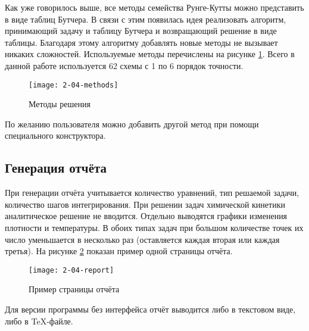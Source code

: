 Как уже говорилось выше, все методы семейства Рунге-Кутты можно представить в виде таблиц Бутчера. В связи с этим появилась идея
реализовать алгоритм, принимающий задачу и таблицу Бутчера и возвращающий решение в виде таблицы. Благодаря этому алгоритму добавлять
новые методы не вызывает никаких сложностей. Используемые методы перечислены на рисунке \ref{fig:SolveMethods}.
Всего в данной работе используется 62 схемы с 1 по 6 порядок точности.

\begin{figure}
    \texttt{[image: 2-04-methods]}
    \caption{Методы решения}
    \label{fig:SolveMethods}
\end{figure}

По желанию пользователя можно добавить другой метод при помощи специального конструктора.

\subsection{Генерация отчёта}

При генерации отчёта учитывается количество уравнений, тип решаемой задачи, количество шагов интегрирования. При решении задач химической
кинетики аналитическое решение не вводится. Отдельно выводятся графики изменения плотности и температуры. В обоих типах задач при
большом количестве точек их число уменьшается в несколько раз (оставляется каждая вторая или каждая третья). На рисунке \ref{fig:report}
показан пример одной страницы отчёта.

\begin{figure}
    \texttt{[image: 2-04-report]}
    \caption{Пример страницы отчёта}
    \label{fig:report}
\end{figure}

Для версии программы без интерфейса отчёт выводится либо в текстовом виде, либо в TeX-файле.
